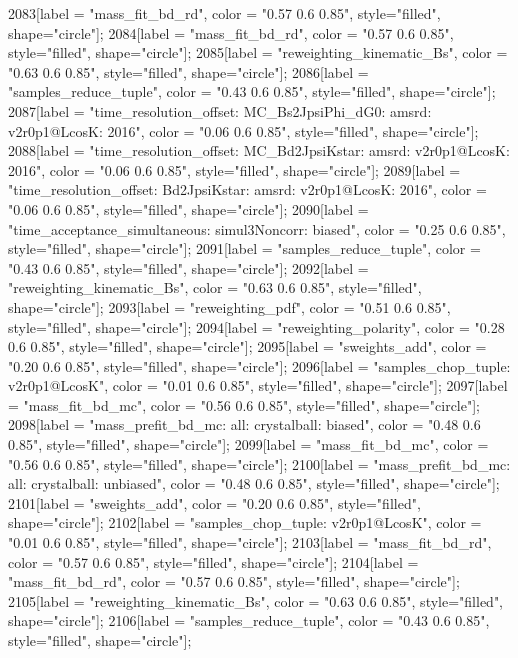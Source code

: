 {	2083[label = "mass_fit_bd_rd", color = "0.57 0.6 0.85", style="filled", shape="circle"];
	2084[label = "mass_fit_bd_rd", color = "0.57 0.6 0.85", style="filled", shape="circle"];
	2085[label = "reweighting_kinematic_Bs", color = "0.63 0.6 0.85", style="filled", shape="circle"];
	2086[label = "samples_reduce_tuple", color = "0.43 0.6 0.85", style="filled", shape="circle"];
	2087[label = "time_resolution_offset\nmode: MC_Bs2JpsiPhi_dG0\ntimeres: amsrd\nversion: v2r0p1@LcosK\nyear: 2016", color = "0.06 0.6 0.85", style="filled", shape="circle"];
	2088[label = "time_resolution_offset\nmode: MC_Bd2JpsiKstar\ntimeres: amsrd\nversion: v2r0p1@LcosK\nyear: 2016", color = "0.06 0.6 0.85", style="filled", shape="circle"];
	2089[label = "time_resolution_offset\nmode: Bd2JpsiKstar\ntimeres: amsrd\nversion: v2r0p1@LcosK\nyear: 2016", color = "0.06 0.6 0.85", style="filled", shape="circle"];
	2090[label = "time_acceptance_simultaneous\ntimeacc: simul3Noncorr\ntrigger: biased", color = "0.25 0.6 0.85", style="filled", shape="circle"];
	2091[label = "samples_reduce_tuple", color = "0.43 0.6 0.85", style="filled", shape="circle"];
	2092[label = "reweighting_kinematic_Bs", color = "0.63 0.6 0.85", style="filled", shape="circle"];
	2093[label = "reweighting_pdf", color = "0.51 0.6 0.85", style="filled", shape="circle"];
	2094[label = "reweighting_polarity", color = "0.28 0.6 0.85", style="filled", shape="circle"];
	2095[label = "sweights_add", color = "0.20 0.6 0.85", style="filled", shape="circle"];
	2096[label = "samples_chop_tuple\nversion: v2r0p1@LcosK", color = "0.01 0.6 0.85", style="filled", shape="circle"];
	2097[label = "mass_fit_bd_mc", color = "0.56 0.6 0.85", style="filled", shape="circle"];
	2098[label = "mass_prefit_bd_mc\nmassbin: all\nmassmodel: crystalball\ntrigger: biased", color = "0.48 0.6 0.85", style="filled", shape="circle"];
	2099[label = "mass_fit_bd_mc", color = "0.56 0.6 0.85", style="filled", shape="circle"];
	2100[label = "mass_prefit_bd_mc\nmassbin: all\nmassmodel: crystalball\ntrigger: unbiased", color = "0.48 0.6 0.85", style="filled", shape="circle"];
	2101[label = "sweights_add", color = "0.20 0.6 0.85", style="filled", shape="circle"];
	2102[label = "samples_chop_tuple\nversion: v2r0p1@LcosK", color = "0.01 0.6 0.85", style="filled", shape="circle"];
	2103[label = "mass_fit_bd_rd", color = "0.57 0.6 0.85", style="filled", shape="circle"];
	2104[label = "mass_fit_bd_rd", color = "0.57 0.6 0.85", style="filled", shape="circle"];
	2105[label = "reweighting_kinematic_Bs", color = "0.63 0.6 0.85", style="filled", shape="circle"];
	2106[label = "samples_reduce_tuple", color = "0.43 0.6 0.85", style="filled", shape="circle"];
}

